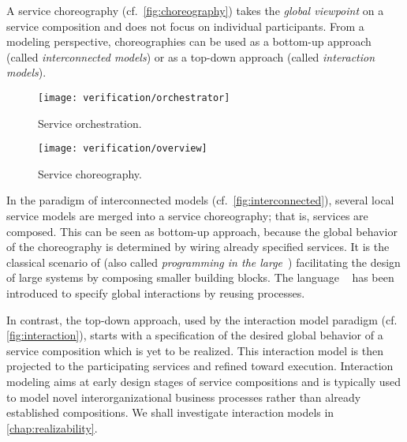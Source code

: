 A service choreography (cf.~\autoref{fig:choreography}) takes the \emph{global viewpoint} on a service composition and does not focus on individual participants. From a modeling perspective, choreographies can be used as a bottom-up approach (called \emph{interconnected models}) or as a top-down approach (called \emph{interaction models}).

\begin{figure}[t!]
\centering
\texttt{[image: verification/orchestrator]}\caption{Service orchestration.}\label{fig:orchestration}
\hfill
{}
\texttt{[image: verification/overview]}
\caption{Service choreography.}\label{fig:choreography}
\end{figure}

In the paradigm of interconnected models (cf.\ \autoref{fig:interconnected}), several local service models are merged into a service choreography; that is, services are composed. This can be seen as bottom-up approach, because the global behavior of the choreography is determined by wiring already specified services. It is the classical scenario of  (also called \emph{programming in the large}~\cite{DeRemerK_1976_tse}) facilitating the design of large systems by composing smaller building blocks. The language \bpelchor~\cite{DeckerKLW_2007_icws} has been introduced to specify global interactions by reusing  processes.

\enlargethispage*{\baselineskip}

In contrast, the top-down approach, used by the interaction model paradigm (cf. \autoref{fig:interaction}), starts with a specification of the desired global behavior of a service composition which is yet to be realized. This interaction model is then projected to the participating services and refined toward execution. Interaction modeling aims at early design stages of service compositions and is typically used to model novel interorganizational business processes rather than already established compositions. We shall investigate interaction models in \autoref{chap:realizability}.

